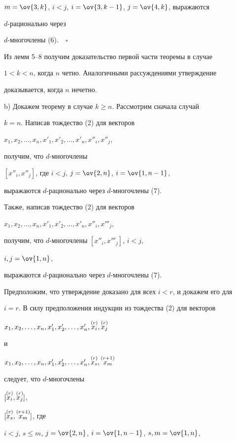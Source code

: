 $m=\ov{3,k}$, $i<j$, $i=\ov{3,k-1}$, $j=\ov{4,k}$, выражаются 


$d$-рационально через 


$d$-многочлены (6).$\quad\square$





Из лемм 5--8 получим доказательство первой части теоремы в случае 


$1<k<n$, когда $n$ четно. Аналогичными рассуждениями утверждение 


доказывается, когда $n$ нечетно.





b) Докажем теорему в случае $k\ge n$. Рассмотрим сначала случай 


$k=n$. Написав тождество (2) для векторов


$x_1,x_2,\dotsc,x_n,x'_1,x'_2,\dotsc,x'_n,x''_i,x''_j$,


получим, что $d$-многочлены


$[x''_i,x''_j]$, где $i<j$, $j=\ov{2,n}$, $i=\ov{1,n-1}$,


выражаются $d$-рационально через $d$-многочлены (7).





Также, написав тождество (2) для векторов


$x_1,x_2,\dotsc,x_n,x'_1,x'_2,\dotsc,x'_n,x''_i,x'''_j$,


получим, что $d$-многочлены $[x''_i,x'''_j]$, $i<j$, 


$i,j=\ov{1,n}$,


выражаются $d$-рационально через $d$-многочлены (7). 


Предположим, что утверждение доказано для всех $i<r$, и докажем его для 


$i=r$. В силу предположения индукции из тождества (2) для векторов


$x_1,x_2,\dotsc,x_n,x'_1,x'_2,\dotsc,x'_n,\overset{(r)}{x_i}{},\overset{(r)}{x_j}{}$


и


$x_1,x_2,\dotsc,x_n,x'_1,x'_2,\dotsc,x'_n,


\up{(r)}{x_s},\up{(r+1)}{x_m}$


следует, что $d$-многочлены


$[\overset{(r)}{x_i}{},\overset{(r)}{x_j}{}]$,


$[\overset{(r)}{x_s}{},\overset{(r+1)}{x_m}{}]$, где


$i<j$, $s\le m$, $j=\ov{2,n}$, $i=\ov{1,n-1}$, $s,m=\ov{1,n}$,


